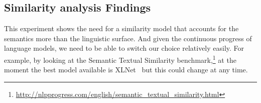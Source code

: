 \subsection{\statusgreen Similarity analysis Findings}
\label{ssec:cgs_similarity_conclusion}

This experiment shows the need for a similarity model that accounts for the semantics more than the linguistic surface. And given the continuous progress of language models, we need to be able to switch our choice relatively easily.
For example, by looking at the Semantic Textual Similarity benchmark,\footnote{\url{http://nlpprogress.com/english/semantic_textual_similarity.html}} at the moment the best model available is XLNet~\citep{yang2019xlnet} but this could change at any time.

